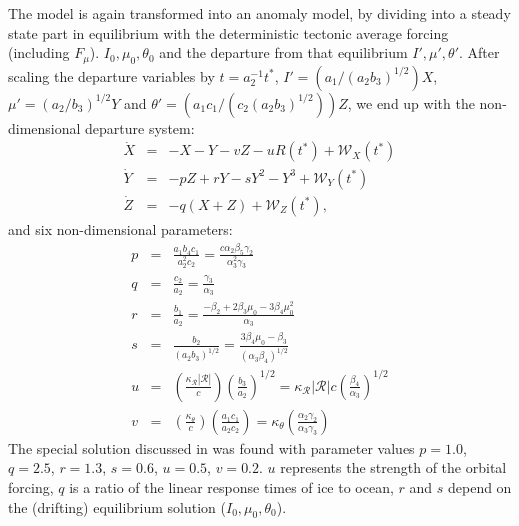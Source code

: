 \documentclass[12pt]{article}
\def\ba{\begin{eqnarray}}
\def\ea{\end{eqnarray}}
\begin{document}
The model is again transformed into an anomaly model, by dividing into a steady state part in equilibrium with the deterministic tectonic average forcing (including $F_\mu$). $I_0, \mu_0, \theta_0$ and the departure from that equilibrium $I', \mu',\theta'$. After scaling the departure variables by $t = a_2^{-1}t^*$, $I'=(a_1/(a_2b_3)^{1/2})X$, $\mu' = (a_2/b_3)^{1/2}Y$ and $\theta' = (a_1c_1/(c_2(a_2b_3)^{1/2}))Z$, we end up with the non-dimensional departure system:
\ba
\dot X &=& -X -Y-vZ-uR(t^*)+\mathcal{W}_X(t^*)\\
\dot Y &=& -pZ + rY -sY^2 -Y^3+\mathcal{W}_Y(t^*)\\
\dot Z &=& -q(X+Z)+\mathcal{W}_Z(t^*),
\label{e:SM91anom}
\ea
and six non-dimensional parameters:
\ba
p &=& \frac{a_1b_4c_1}{a_2^2c_2}=\frac{c\alpha_2\beta_5\gamma_2}{\alpha_3^2\gamma_3}
\nonumber\\
q &=& \frac{c_2}{a_2}=\frac{\gamma_3}{\alpha_3}
\nonumber\\
r &=&\frac{b_1}{a_2}=\frac{-\beta_2+2\beta_3\mu_0-3\beta_4\mu_0^2}{\alpha_3}
\nonumber\\
s &=&\frac{b_2}{(a_2 b_3)^{1/2}} = \frac{3\beta_4\mu_0-\beta_3}{(\alpha_3\beta_4)^{1/2}}
\nonumber\\
u &=& \left(\frac{\kappa_\mathcal{R}|\mathcal{R}|}{c}\right)\left(\frac{b_3}{a_2}\right)^{1/2} = \kappa_\mathcal{R}|\mathcal{R}|c\left(\frac{\beta_4}{\alpha_3}\right)^{1/2}
\nonumber\\
v &=& \left(\frac{\kappa_\theta}{c}\right)\left(\frac{a_1c_1}{a_2 c_2}\right) = \kappa_\theta\left(\frac{\alpha_2\gamma_2}{\alpha_3\gamma_3}\right)
\nonumber
\ea
The special solution discussed in \cite{Saltzman:1991jl} was found with parameter values $p=1.0$, $q=2.5$, $r=1.3$, $s=0.6$, $u=0.5$, $v=0.2$. $u$ represents the strength of the orbital forcing, $q$ is a ratio of the linear response times of ice to ocean, $r$ and $s$ depend on the (drifting) equilibrium solution ($I_0,\mu_0,\theta_0$).  







\end{document}
